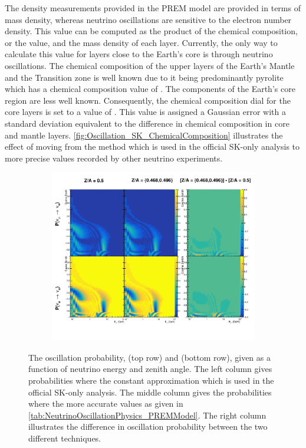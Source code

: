 The density measurements provided in the PREM model are provided in terms of mass density, whereas neutrino oscillations are sensitive to the electron number density. This value can be computed as the product of the chemical composition, or the  value, and the mass density of each layer. Currently, the only way to calculate this value for layers close to the Earth's core is through neutrino oscillations. The chemical composition of the upper layers of the Earth's Mantle and the Transition zone is well known due to it being predominantly pyrolite which has a chemical composition value of  \cite{Bourret_2017}. The components of the Earth's core region are less well known. Consequently, the chemical composition dial for the core layers is set to a value of  \cite{Rott2015}. This value is assigned a Gaussian error with a standard deviation equivalent to the difference in chemical composition in core and mantle layers. \autoref{fig:Oscillation_SK_ChemicalComposition} illustrates the effect of moving from the  method which is used in the official SK-only analysis \cite{thesis_roger} to more precise values recorded by other neutrino experiments.

\begin{figure}[h]
  \begin{subfigure}[t]{\textwidth}
    \includegraphics[width=\textwidth, trim={0mm 0mm 0mm 0mm}, clip,page=1]{Figures/Oscillation/ChemicalComposition.pdf}
  \end{subfigure}
  \caption{The oscillation probability,  (top row) and  (bottom row), given as a function of neutrino energy and zenith angle. The left column gives probabilities where the constant  approximation which is used in the official SK-only analysis. The middle column gives the probabilities where the more accurate  values as given in \autoref{tab:NeutrinoOscillationPhysics_PREMModel}. The right column illustrates the difference in oscillation probability between the two different techniques.}
  \label{fig:Oscillation_SK_ChemicalComposition}
\end{figure}

